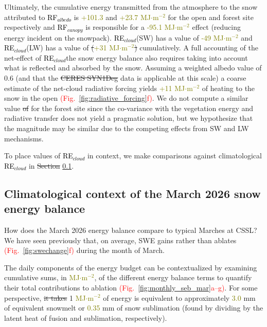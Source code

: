 \documentclass[draft]{agujournal2019}
\newcommand{\fig}[2]{\textcolor{red}{(Fig.~\ref{#1}{#2})}}   %
\newcommand{\mynum}[1]{\textcolor{olive}{#1}}
\newcommand{\lwdn}{\textcolor{black}{$LW\downarrow$}\xspace}
\newcommand{\rfalb}{\textcolor{black}{RF$_{albedo}$}\xspace}
\newcommand{\rfcirrus}{\textcolor{black}{RE$_{cloud}$}\xspace}
\newcommand{\rfcanopy}{\textcolor{black}{RF$_{canopy}$}\xspace}
\newcommand{\mjmtwo}{\textcolor{olive}{MJ$\cdot$m$^{-2}$}\xspace}
\providecommand{\DIFadd}[1]{{\protect\color{blue}\uwave{#1}}} %
\providecommand{\DIFdel}[1]{{\protect\color{red}\sout{#1}}}                      %
\providecommand{\DIFaddbegin}{} %
\providecommand{\DIFaddend}{} %
\providecommand{\DIFdelbegin}{} %
\providecommand{\DIFdelend}{} %
\begin{document}
Ultimately, the cumulative energy transmitted from the atmosphere to the snow attributed to \rfalb is \mynum{+101.3} and \mynum{+23.7} \mjmtwo for the open and forest site respectively and \rfcanopy is responsible for a \mynum{-95.1} \mjmtwo effect (reducing energy incident on the snowpack).
\rfcirrus (SW) has a value of \mynum{-49} \mjmtwo and \rfcirrus (LW) has a value of \DIFdelbegin %
\DIFdel{(}\DIFdelend \mynum{+31} \mjmtwo \DIFdelbegin \DIFdel{) }\DIFdelend cumulatively.
A full accounting of the net-effect of \rfcirrus \DIFaddbegin \DIFadd{on }\DIFaddend the snow energy balance also requires taking into account what is reflected and absorbed by the snow.
Assuming a weighted albedo value of 0.6 (and that the \DIFdelbegin \DIFdel{CERES SYN1Deg }\DIFdelend \DIFaddbegin \DIFadd{CERES-SYN1Deg }\DIFaddend data is applicable at this scale) a coarse estimate of the net-cloud radiative forcing yields \mynum{+11} \mjmtwo of heating to the snow in the open \fig{fig:radiative_forcing}{f}.
We do not compute a similar value \DIFdelbegin \DIFdel{of }\DIFdelend for the forest site since the co-variance with the vegetation energy and radiative transfer does not yield a pragmatic solution, but we hypothesize that the magnitude may be similar due to the competing effects from SW and LW mechanisms.

To place values of \rfcirrus in context, we make comparisons against climatological \rfcirrus in \DIFdelbegin \DIFdel{Section }\DIFdelend \DIFaddbegin \DIFadd{Sec. }\DIFaddend \ref{sec:climo_comparison}.




\subsection{Climatological context of the March 2026 snow energy balance}\label{sec:climo_comparison}
%
How does the March 2026 energy balance compare to typical Marches at CSSL?
We have seen previously that, on average, SWE gains rather than ablates \fig{fig:swechange}{f} during the month of March.

The daily components of the energy budget can be contextualized by examining cumulative sums, in \mjmtwo, of the different energy balance terms to quantify their total contributions to ablation \fig{fig:monthly_seb_mar}{a--g}.
For some perspective, \DIFdelbegin \DIFdel{it takes }\DIFdelend 1 \mjmtwo of energy is equivalent to approximately \mynum{3.0} mm of equivalent snowmelt or \mynum{0.35} mm of snow sublimation (found by dividing by the latent heat of fusion and sublimation, respectively).
\end{document}
